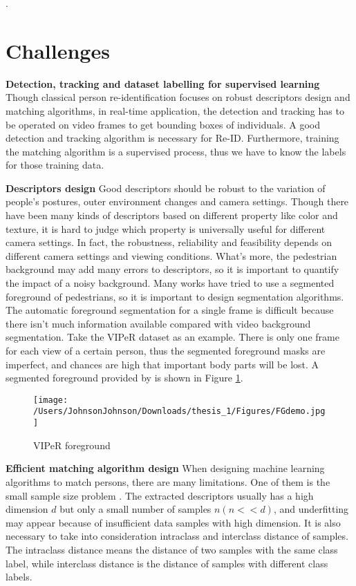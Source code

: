 .

\section{Challenges}

\textbf{Detection, tracking and dataset labelling for supervised learning} Though classical person re-identification focuses on robust descriptors design and matching algorithms, in real-time application, the detection and tracking has to be operated on video frames to get bounding boxes of individuals. A good detection and tracking algorithm is necessary for Re-ID. Furthermore, training the matching algorithm is a supervised process, thus we have to know the labels for those training data. 

\textbf{Descriptors design} Good descriptors should be robust to the variation of people's postures, outer environment changes and camera settings. Though there have been many kinds of descriptors based on different property like color and texture, it is hard to judge which property is universally useful for different camera settings. In fact, the robustness, reliability and feasibility depends on different camera settings and viewing conditions. What's more, the pedestrian background may add many errors to descriptors, so it is important to quantify the impact of a noisy background. Many works have tried to use a segmented foreground of pedestrians, so it is important to design segmentation algorithms. The automatic foreground segmentation for a single frame is difficult because there isn't much information available compared with video background segmentation. Take the VIPeR dataset as an example. There is only one frame for each view of a certain person, thus the segmented foreground masks are imperfect, and chances are high that important body parts will be lost. A segmented foreground provided by \cite{SDALF} is shown in Figure \ref{VIPeRFG}.
\begin{figure}[H]
\centering
\texttt{[image: /Users/JohnsonJohnson/Downloads/thesis\_1/Figures/FGdemo.jpg]}
\vspace{-3em}
\caption{VIPeR foreground}
\label{VIPeRFG}
\end{figure}

\textbf{Efficient matching algorithm design} 	
When designing machine learning algorithms to match persons, there are many limitations. One of them is the small sample size problem \cite{NFST}. The extracted descriptors usually has a high dimension $d$ but only a small number of samples $n(n<<d)$, and underfitting may appear because of insufficient data samples with high dimension. It is also necessary to take into consideration intraclass and interclass distance of samples. The intraclass distance means the distance of two samples with the same class label, while interclass distance is the distance of samples with different class labels. 

